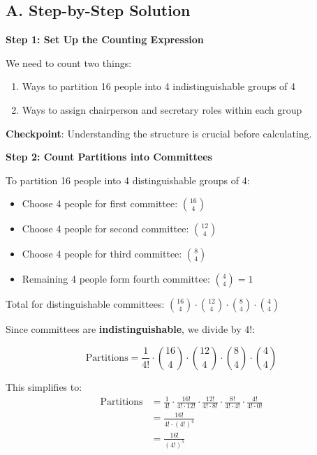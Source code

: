 \documentclass[12pt]{article}
\begin{document}
\begin{solutionbox}
\subsection*{A. Step-by-Step Solution}

\textbf{Step 1: Set Up the Counting Expression}

We need to count two things:
\begin{enumerate}
    \item Ways to partition 16 people into 4 indistinguishable groups of 4
    \item Ways to assign chairperson and secretary roles within each group
\end{enumerate}

\textbf{Checkpoint}: Understanding the structure is crucial before calculating.

\vspace{0.3cm}

\textbf{Step 2: Count Partitions into Committees}

To partition 16 people into 4 distinguishable groups of 4:
\begin{itemize}
    \item Choose 4 people for first committee: $\binom{16}{4}$
    \item Choose 4 people for second committee: $\binom{12}{4}$
    \item Choose 4 people for third committee: $\binom{8}{4}$
    \item Remaining 4 people form fourth committee: $\binom{4}{4} = 1$
\end{itemize}

Total for distinguishable committees: $\binom{16}{4} \cdot \binom{12}{4} \cdot \binom{8}{4} \cdot \binom{4}{4}$

Since committees are \textbf{indistinguishable}, we divide by $4!$:

$$\text{Partitions} = \frac{1}{4!} \cdot \binom{16}{4} \cdot \binom{12}{4} \cdot \binom{8}{4} \cdot \binom{4}{4}$$

This simplifies to:
\begin{align*}
    \text{Partitions} &= \frac{1}{4!} \cdot \frac{16!}{4! \cdot 12!} \cdot \frac{12!}{4! \cdot 8!} \cdot \frac{8!}{4! \cdot 4!} \cdot \frac{4!}{4! \cdot 0!} \\
    &= \frac{16!}{4! \cdot (4!)^4} \\
    &= \frac{16!}{(4!)^5}
\end{align*}


\end{solutionbox}
\end{document}
